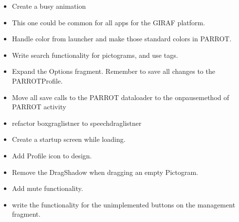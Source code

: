 \begin{itemize}
	
	
	
	\item Create a busy animation
		\item This one could be common for all apps for the GIRAF platform.
	\item Handle color from launcher and make those standard colors in PARROT.
	
	\item Write search functionality for pictograms, and use tags.
	\item Expand the Options fragment.
		\subitem Remember to save all changes to the PARROTProfile.
	
	
	
	\item Move all save calls to the PARROT dataloader to the onpausemethod of PARROT activity 
	\item refactor boxgraglistner to speechdraglistner 
	\item Create a startup screen while loading. 
	\item Add Profile icon to design.
	\item Remove the DragShadow when dragging an empty Pictogram.
	
	\item Add mute functionality.
	\item write the functionality for the unimplemented buttons on the management fragment.
\end{itemize}


